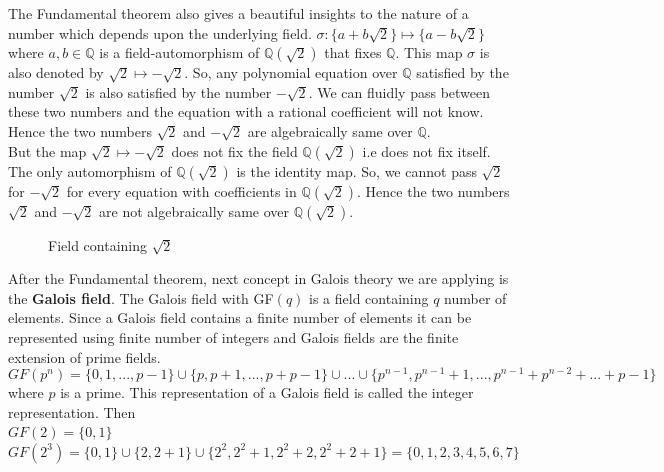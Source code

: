 \documentclass[a4paper,twoside,10pt]{article}
\theoremstyle{plain}
\theoremstyle{definition}
\begin{document}
\noindent
The Fundamental theorem also gives a beautiful insights to the nature of a number which depends upon the underlying field. \(\sigma:\{a+b\sqrt{2}\} \mapsto \{a-b\sqrt{2}\}\) where \(a,b \in \mathbb{Q}\) is a field-automorphism of  \(\mathbb{Q}(\sqrt{2})\) that fixes \(\mathbb{Q}\). This map \(\sigma \) is also denoted by \(\sqrt{2} \longmapsto -\sqrt{2}\). So, any polynomial equation over \(\mathbb{Q}\) satisfied by the number \(\sqrt{2}\) is also satisfied by the number \(-\sqrt{2}\). We can fluidly pass between these two numbers and the equation with a rational coefficient will not know. Hence the two numbers \(\sqrt{2}\) and \(-\sqrt{2}\) are algebraically same over \(\mathbb{Q}\).\\

But the map \(\sqrt{2} \longmapsto -\sqrt{2}\) does not fix the field \(\mathbb{Q}(\sqrt{2})\) i.e does not fix itself. The only automorphism of \(\mathbb{Q}(\sqrt{2})\) is the identity map. So, we cannot pass \(\sqrt{2}\) for \(-\sqrt{2}\) for every equation with coefficients in \(\mathbb{Q}(\sqrt{2})\). Hence the two numbers \(\sqrt{2}\) and \(-\sqrt{2}\) are not algebraically same over \(\mathbb{Q}(\sqrt{2})\).

\begin{figure}[h]
  \centering
  \small
    \caption{\footnotesize Field containing \(\sqrt{2}\)}
    \end{figure}

    After the Fundamental theorem, next concept in Galois theory we are applying is the \textbf{Galois field}. The Galois field with GF\((q)\) is a field containing \(q\) number of elements. Since a Galois field contains a finite number of elements it can be represented using finite number of integers \cite{galois} and Galois fields are the finite extension of prime fields.
    \begin{equation*}
      GF(p^n)=\{0,1,...,p-1\} \cup \{p,p+1,...,p+p-1\} \cup ... \cup \{p^{n-1},p^{n-1}+1,...,p^{n-1}+p^{n-2}+...+p-1\}
    \end{equation*}
    where \(p\) is a prime. This representation of a Galois field is called the integer representation. Then\\
    \(GF(2)=\{0,1\}\)\\
    \(GF(2^3)=\{0,1\} \cup \{2,2+1\} \cup \{2^2,2^2+1,2^2+2,2^2+2+1\}=\{0,1,2,3,4,5,6,7\}\)\\
\end{document}
